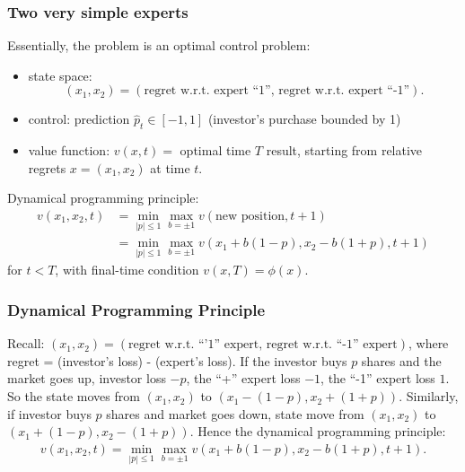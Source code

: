 \documentclass{beamer}
\begin{document}
\begin{frame}
\frametitle{Two very simple experts}
Essentially,  the problem is an optimal control problem:
\begin{itemize}
\pause
\item{\color{red}state space:}$$(x_1,x_2) = (\text{regret w.r.t.  expert ``1'', regret w.r.t.  expert ``-1''}).$$
\pause
\item {\color{red}control:} prediction $\hat{p}_t\in[-1,1]$ ({\color{blue}investor's purchase bounded by 1}) 
\pause
\item {\color{red}value function:} $v(x,t) = $ optimal time $T$ result, starting from relative regrets $x = (x_1,x_2)$ at time $t$. 
\end{itemize}

{\color{red}Dynamical programming principle:}
\begin{align*}
v(x_1,x_2,t) &= \min_{|p|\le 1}\max_{b = \pm 1}v(\text{new position},t+1)\\
                    & = \min_{|p|\le 1}\max_{b = \pm 1}v(x_1 + b(1-p),x_2-b(1+p),t+1)		
\end{align*}
for $t<T$, with final-time condition $v(x,T) = \phi(x).$

\end{frame}

\begin{frame}
\frametitle{Dynamical Programming Principle}
Recall: {\color{red}$(x_1,x_2) = (\text{regret w.r.t. ``'1'' expert, regret w.r.t. ``-1'' expert})$}, where regret  = (investor's loss) - (expert's loss).
\vfill
If the investor buys $p$ shares and the market goes up, investor loss $-p$, the 
``+'' expert loss $-1$, the ``-1'' expert loss $1$. So the state moves from $(x_1,x_2)$ to $(x_1-(1-{p}),x_2+(1+{p})).$
\vfill
Similarly, if investor buys ${p}$ shares  and market goes down, state move from $(x_1,x_2)$ to $(x_1+(1-{p}),x_2-(1+{p})).$
\vfill
Hence the dynamical programming principle:
 \begin{align*}
 v(x_1,x_2,t) = \min_{|p|\le 1}\max_{b = \pm 1}v(x_1 + b(1-p),x_2-b(1+p),t+1).
 \end{align*}

\end{frame}
\end{document}
